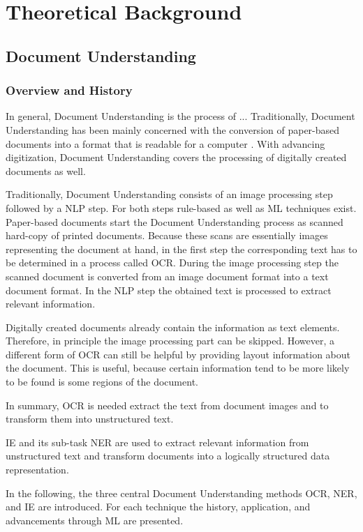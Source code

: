 \chapter{Theoretical Background}

\section{Document Understanding}
\subsection{Overview and History}
In general, Document Understanding is the process of ...
Traditionally, Document Understanding has been mainly concerned with the conversion of paper-based documents into a format that is readable for a computer \cite{taylor1994integrated}. 
With advancing digitization, Document Understanding covers the processing of digitally created documents as well. 

Traditionally, Document Understanding consists of an image processing step followed by a \ac{NLP} step. For both steps rule-based as well as \ac{ML} techniques exist. Paper-based documents start the Document Understanding process as scanned hard-copy of printed documents. Because these scans are essentially images representing the document at hand, in the first step the corresponding text has to be determined in a process called \ac{OCR}. During the image processing step the scanned document is converted from an image document format into a text document format. In the \ac{NLP} step the obtained text is processed to extract relevant information.

Digitally created documents already contain the information as text elements. Therefore, in principle the image processing part can be skipped. However, a different form of \ac{OCR} can still be helpful by providing layout information about the document. This is useful, because certain information tend to be more likely to be found is some regions of the document.

In summary, \ac{OCR} is needed extract the text from document images and to transform them into unstructured text.

\ac{IE} and its sub-task \ac{NER} are used to extract relevant information from unstructured text and transform documents into a logically structured data representation.

In the following, the three central Document Understanding methods \ac{OCR}, \ac{NER}, and \ac{IE} are introduced. For each technique the history, application, and advancements through \ac{ML} are presented.
